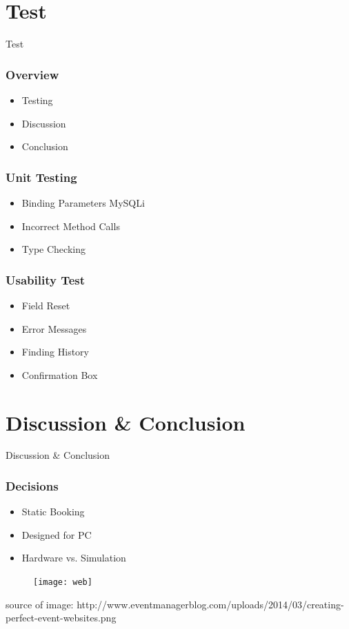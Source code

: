 \section{Test}
\begin{frame}
\begin{center}
\Huge Test
\end{center}
\end{frame}

\begin{frame}
\frametitle{Overview}
\begin{itemize}
	\item Testing
	\item Discussion
	\item Conclusion
\end{itemize}	
\end{frame}

\begin{frame}
\frametitle{Unit Testing}
\begin{itemize}
	\item Binding Parameters MySQLi
	\item Incorrect Method Calls
	\item Type Checking
\end{itemize}
\end{frame}

\begin{frame}
\frametitle{Usability Test}
\begin{itemize}
	\item Field Reset
	\item Error Messages
	\item Finding History
	\item Confirmation Box
\end{itemize}
\end{frame}

\section{Discussion \& Conclusion}
\begin{frame}
\begin{center}
\Huge Discussion \& Conclusion
\end{center}
\end{frame}
\begin{frame}
\frametitle{Decisions}
\begin{itemize}
	\item Static Booking
	\item Designed for PC
	\item Hardware vs. Simulation
\end{itemize}
\begin{figure}
	\centering
	\texttt{[image: web]}
\end{figure}

\bigskip
\btVFill
\tiny source of image: http://www.eventmanagerblog.com/uploads/2014/03/creating-perfect-event-websites.png
\end{frame}

